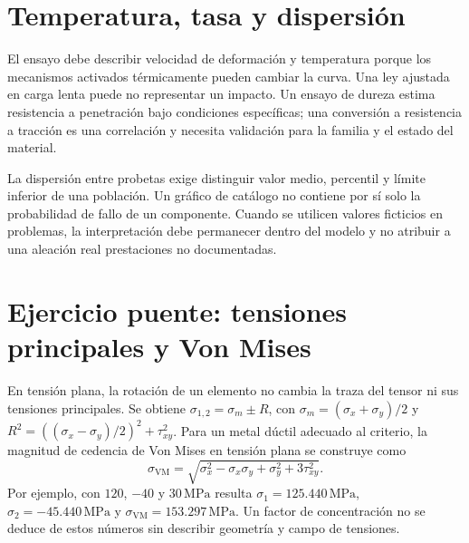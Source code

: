 \section{Temperatura, tasa y dispersión}
El ensayo debe describir velocidad de deformación y temperatura porque los mecanismos activados térmicamente pueden cambiar la curva. Una ley ajustada en carga lenta puede no representar un impacto. Un ensayo de dureza estima resistencia a penetración bajo condiciones específicas; una conversión a resistencia a tracción es una correlación y necesita validación para la familia y el estado del material.

La dispersión entre probetas exige distinguir valor medio, percentil y límite inferior de una población. Un gráfico de catálogo no contiene por sí solo la probabilidad de fallo de un componente. Cuando se utilicen valores ficticios en problemas, la interpretación debe permanecer dentro del modelo y no atribuir a una aleación real prestaciones no documentadas.
\section{Ejercicio puente: tensiones principales y Von Mises}
En tensión plana, la rotación de un elemento no cambia la traza del tensor ni sus tensiones principales. Se obtiene $\sigma_{1,2}=\sigma_m\pm R$, con $\sigma_m=(\sigma_x+\sigma_y)/2$ y $R^2=((\sigma_x-\sigma_y)/2)^2+\tau_{xy}^2$. Para un metal dúctil adecuado al criterio, la magnitud de cedencia de Von Mises en tensión plana se construye como
\[
\sigma_{\mathrm{VM}}=\sqrt{\sigma_x^2-\sigma_x\sigma_y+\sigma_y^2+3\tau_{xy}^2}.
\]
Por ejemplo, con $120$, $-40$ y $30\,\mathrm{MPa}$ resulta $\sigma_1=125.440\,\mathrm{MPa}$, $\sigma_2=-45.440\,\mathrm{MPa}$ y $\sigma_{\mathrm{VM}}=153.297\,\mathrm{MPa}$. Un factor de concentración no se deduce de estos números sin describir geometría y campo de tensiones.


